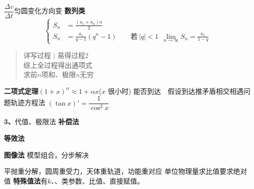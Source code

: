 $\dfrac{\Delta v}{\Delta t}$\quad 匀圆变化\quad 方向变
\textbf{数列类}
\[
\left\{\begin{aligned}
S_n&=\frac{(a_1+a_n)n}{2}\\
S_n&=\frac{a_1}{q-1}(q^{n}-1)\qquad \text{若}\ |q|<1\ \ \lim_{n\to\infty}S_n=\frac{a_1}{1-q}
\end{aligned}\right.
\]
\begin{quote}
详写过程 $|$ 易得过程2\\
综上全过程得出通项式\\
求前$n$项和、极限$n$无穷
\end{quote}
\textbf{二项式定理}\quad $(1+x)^{\alpha}\approx 1+\alpha x$\quad ($x$ 很小时)
能否到达\ \ 假设到达推矛盾\qquad 相交相遇问题轨迹方程法
$(\tan x)'=\dfrac{1}{\cos^2 x}$

\textbf{3、}代值、极限法
\textbf{补偿法}

\textbf{等效法}

\textbf{图像法}
模型组合，分步解决

平抛重分解，圆周重受力，天体重轨道，功能重对应
单位\unclear{$\ne$}物理量\qquad 求比值要求绝对值
\textbf{特殊值法}\quad 有$k$、、类参数、比值、直接赋值。
